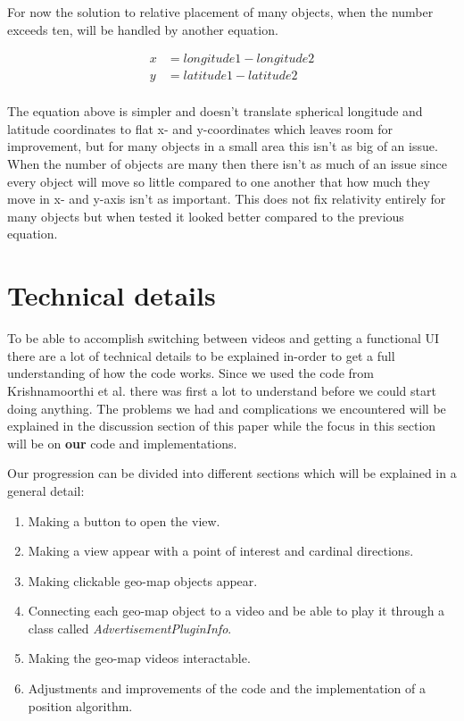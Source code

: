 For now the solution to relative placement of many objects, when the number exceeds ten, will be handled by another equation. 

\begin{align*}
x &= longitude1-longitude2  \\
y &= latitude1-latitude2 \\
\end{align*}

The equation above is simpler and doesn't translate spherical longitude and latitude coordinates to flat x- and y-coordinates which leaves room for improvement, but for many objects in a small area this isn't as big of an issue. When the number of objects are many then there isn't as much of an issue since every object will move so little compared to one another that how much they move in x- and y-axis isn't as important. This does not fix relativity entirely for many objects but when tested it looked better compared to the previous equation. 

\section{Technical details}
\label{sec:technicaldetails}

To be able to accomplish switching between videos and getting a functional UI there are a lot of technical details to be explained in-order to get a full understanding of how the code works. Since we used the code from Krishnamoorthi et al.\cite{qualbranch} there was first a lot to understand before we could start doing anything. The problems we had and complications we encountered will be explained in the discussion section of this paper while the focus in this section will be on \textbf{our} code and implementations. 

Our progression can be divided into different sections which will be explained in a general detail:

\begin{enumerate}
\item Making a button to open the view.

\item Making a view appear with a point of interest and cardinal directions.

\item Making clickable geo-map objects appear.

\item Connecting each geo-map object to a video and be able to play it through a class called \textit{AdvertisementPluginInfo}.

\item Making the geo-map videos interactable.


\item Adjustments and improvements of the code and the implementation of a position algorithm. 
\end{enumerate}


